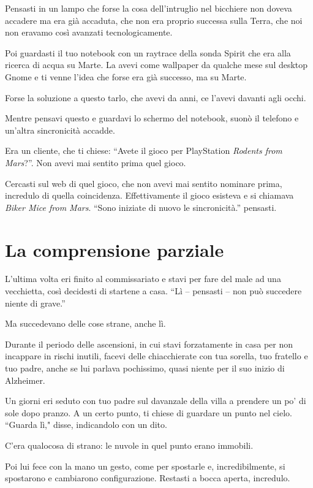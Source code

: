 Pensasti in un lampo che forse la cosa dell'intruglio nel bicchiere non doveva accadere ma era già accaduta, che non era proprio successa sulla Terra, che noi non eravamo così avanzati tecnologicamente.

Poi guardasti il tuo notebook con un raytrace della sonda Spirit che era alla ricerca di acqua su Marte. La avevi come wallpaper da qualche mese sul desktop Gnome e ti venne l'idea che forse era già successo, ma su Marte.

Forse la soluzione a questo tarlo, che avevi da anni, ce l'avevi davanti agli occhi.

Mentre pensavi questo e guardavi lo schermo del notebook, suonò il telefono e un'altra sincronicità accadde.

Era un cliente, che ti chiese: “Avete il gioco per PlayStation \textit{Rodents from Mars}?”. Non avevi mai sentito prima quel gioco.

Cercasti sul web di quel gioco, che non avevi mai sentito nominare prima, incredulo di quella coincidenza. Effettivamente il gioco esisteva e si chiamava \textit{Biker Mice from Mars}. “Sono iniziate di nuovo le sincronicità.” pensasti.

\section{La comprensione parziale}
\label{comprensione_parziale}

L'ultima volta eri finito al commissariato e stavi per fare del male ad una vecchietta, così decidesti di startene a casa. “Lì -- pensasti -- non può succedere niente di grave.”

Ma succedevano delle cose strane, anche lì.

Durante il periodo delle ascensioni, in cui stavi forzatamente in casa per non incappare in rischi inutili, facevi delle chiacchierate con tua sorella, tuo fratello e tuo padre, anche se lui parlava pochissimo, quasi niente per il suo inizio di Alzheimer.

Un giorni eri seduto con tuo padre sul davanzale della villa a prendere un po' di sole dopo pranzo. A un certo punto, ti chiese di guardare un punto nel cielo. “Guarda lì," disse, indicandolo con un dito.

C'era qualocosa di strano: le nuvole in quel punto erano immobili.

Poi lui fece con la mano un gesto, come per spostarle e, incredibilmente, si spostarono e cambiarono configurazione.  Restasti a bocca aperta, incredulo.

